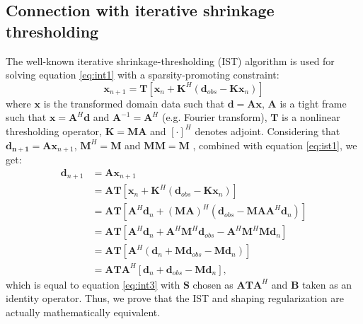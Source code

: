 \subsection{Connection with iterative shrinkage thresholding}
The well-known iterative shrinkage-thresholding (IST) algorithm is used for solving equation \ref{eq:int1} with a sparsity-promoting constraint:
\begin{equation}
\label{eq:ist1}
\mathbf{x}_{n+1} = \mathbf{T}[\mathbf{x}_n+\mathbf{K}^H(\mathbf{d}_{obs}-\mathbf{K}\mathbf{x}_n)]
\end{equation}
where $\mathbf{x}$ is the transformed domain data such that $\mathbf{d}=\mathbf{A}\mathbf{x}$, $\mathbf{A}$ is a tight frame such that $\mathbf{x}=\mathbf{A}^H\mathbf{d}$ and $\mathbf{A}^{-1}=\mathbf{A}^{H}$ (e.g. Fourier transform), $\mathbf{T}$ is a nonlinear thresholding operator, $\mathbf{K}=\mathbf{MA}$ and $[\cdot]^H$ denotes adjoint. Considering that $\mathbf{d_{n+1}}=\mathbf{A}\mathbf{x}_{n+1}$, $\mathbf{M}^H=\mathbf{M}$ and $\mathbf{MM}=\mathbf{M}$ , combined with equation \ref{eq:ist1}, we get:
\begin{equation}
\label{eq:prove1}
\begin{split}
\mathbf{d}_{n+1} &= \mathbf{A} \mathbf{x}_{n+1} \\
	&= \mathbf{A} \mathbf{T} [\mathbf{x}_n+\mathbf{K}^H(\mathbf{d}_{obs}-\mathbf{K}\mathbf{x}_n)] \\
	&= \mathbf{A} \mathbf{T} [\mathbf{A}^H\mathbf{d}_n+(\mathbf{MA})^H (\mathbf{d}_{obs} - \mathbf{MAA}^H\mathbf{d}_n)] \\
	&= \mathbf{A} \mathbf{T} [\mathbf{A}^H\mathbf{d}_n+\mathbf{A}^H\mathbf{M}^H\mathbf{d}_{obs}-\mathbf{A}^H\mathbf{M}^H\mathbf{M}\mathbf{d}_n] \\
	&= \mathbf{A} \mathbf{T} [\mathbf{A}^H (\mathbf{d}_n+\mathbf{Md}_{obs}-\mathbf{M}\mathbf{d}_n)] \\
	&= \mathbf{A} \mathbf{T} \mathbf{A}^H [\mathbf{d}_n+\mathbf{d}_{obs}-\mathbf{M}\mathbf{d}_n],
\end{split}
\end{equation}
which is equal to equation \ref{eq:int3} with $\mathbf{S}$ chosen as $\mathbf{ATA}^H$ and $\mathbf{B}$ taken as an identity operator.
Thus, we prove that the IST and shaping regularization are actually mathematically equivalent.


